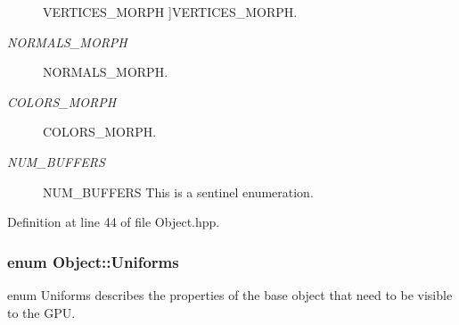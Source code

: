 \begin{Desc}
\begin{description}
{\hypertarget{class_object_a74a39247838865244defd0ae9712df9ba0e9e165431001465775bc5ba2b8d1bd8}{V\-E\-R\-T\-I\-C\-E\-S\-\_\-\-M\-O\-R\-P\-H}\label{class_object_a74a39247838865244defd0ae9712df9ba0e9e165431001465775bc5ba2b8d1bd8}
}]V\-E\-R\-T\-I\-C\-E\-S\-\_\-\-M\-O\-R\-P\-H. \item[{\em 
\hypertarget{class_object_a74a39247838865244defd0ae9712df9baa2afe042e85c0772ba75ba0ee6223a57}{N\-O\-R\-M\-A\-L\-S\-\_\-\-M\-O\-R\-P\-H}\label{class_object_a74a39247838865244defd0ae9712df9baa2afe042e85c0772ba75ba0ee6223a57}
}]N\-O\-R\-M\-A\-L\-S\-\_\-\-M\-O\-R\-P\-H. \item[{\em 
\hypertarget{class_object_a74a39247838865244defd0ae9712df9ba814c8171ad45f6e954ffb474a5dfacb1}{C\-O\-L\-O\-R\-S\-\_\-\-M\-O\-R\-P\-H}\label{class_object_a74a39247838865244defd0ae9712df9ba814c8171ad45f6e954ffb474a5dfacb1}
}]C\-O\-L\-O\-R\-S\-\_\-\-M\-O\-R\-P\-H. \item[{\em 
\hypertarget{class_object_a74a39247838865244defd0ae9712df9ba1999a38dc687c7ae05c884078de39b51}{N\-U\-M\-\_\-\-B\-U\-F\-F\-E\-R\-S}\label{class_object_a74a39247838865244defd0ae9712df9ba1999a38dc687c7ae05c884078de39b51}
}]N\-U\-M\-\_\-\-B\-U\-F\-F\-E\-R\-S This is a sentinel enumeration. \end{description}
\end{Desc}


Definition at line 44 of file Object.\-hpp.

\hypertarget{class_object_a8c11d8700b0bb79a46c61f2de4f23fa3}{
\subsubsection[{Uniforms}]{\setlength{\rightskip}{0pt plus 5cm}enum {\bf Object\-::\-Uniforms}}}\label{class_object_a8c11d8700b0bb79a46c61f2de4f23fa3}


enum Uniforms describes the properties of the base object that need to be visible to the G\-P\-U. 

